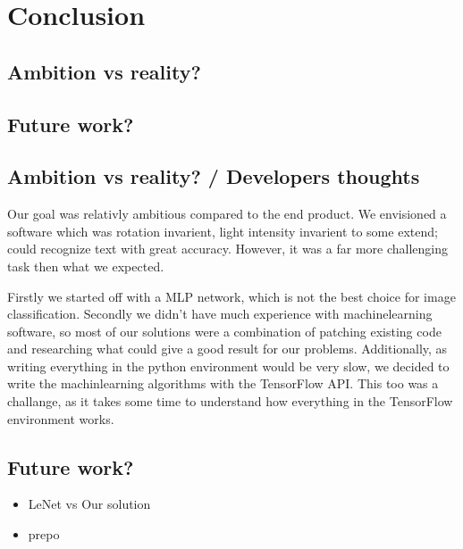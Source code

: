 \documentclass[Report.tex]{subfiles}
\begin{document}
\chapter{Conclusion}
\label{chap:Conclusion}
\section{Ambition vs reality?}
\section{Future work?}


\section{Ambition vs reality? / Developers thoughts}
Our goal was relativly ambitious compared to the end product. We envisioned
a software which was rotation invarient, light intensity invarient to some
extend; could recognize text with great accuracy. However, it was a far more
challenging task then what we expected. \par
Firstly we started off with a MLP network, which is not the best choice for
image classification. Secondly we didn't have much experience with
machinelearning software, so most of our solutions were a combination of
patching existing code and researching what could give a good result for
our problems. Additionally, as writing everything in the python environment
would be very slow, we decided to write the machinlearning algorithms with the
TensorFlow API. This too was a challange, as it takes some time to understand
how everything in the TensorFlow environment works.


\section{Future work?}

\begin{itemize}
  \item LeNet vs Our solution
  \item prepo
\end{itemize}
\end{document}
